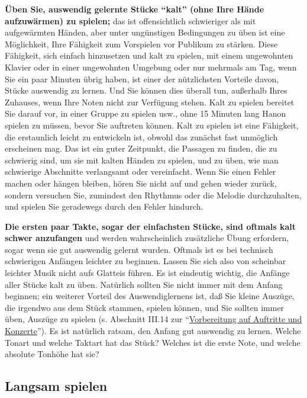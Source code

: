 \textbf{Üben Sie, auswendig gelernte Stücke \enquote{kalt} (ohne Ihre Hände aufzuwärmen) zu spielen;} das ist offensichtlich schwieriger als mit aufgewärmten Händen, aber unter ungünstigen Bedingungen zu üben ist eine Möglichkeit, Ihre Fähigkeit zum Vorspielen vor Publikum zu stärken.
Diese Fähigkeit, sich einfach hinzusetzen und kalt zu spielen, mit einem ungewohnten Klavier oder in einer ungewohnten Umgebung oder nur mehrmals am Tag, wenn Sie ein paar Minuten übrig haben, ist einer der nützlichsten Vorteile davon, Stücke auswendig zu lernen.
Und Sie können dies überall tun, außerhalb Ihres Zuhauses, wenn Ihre Noten nicht zur Verfügung stehen.
Kalt zu spielen bereitet Sie darauf vor, in einer Gruppe zu spielen usw., ohne 15 Minuten lang Hanon spielen zu müssen, bevor Sie auftreten können.
Kalt zu spielen ist eine Fähigkeit, die erstaunlich leicht zu entwickeln ist, obwohl das zunächst fast unmöglich erscheinen mag.
Das ist ein guter Zeitpunkt, die Passagen zu finden, die zu schwierig sind, um sie mit kalten Händen zu spielen, und zu üben, wie man schwierige Abschnitte verlangsamt oder vereinfacht.
Wenn Sie einen Fehler machen oder hängen bleiben, hören Sie nicht auf und gehen wieder zurück, sondern versuchen Sie, zumindest den Rhythmus oder die Melodie durchzuhalten, und spielen Sie geradewegs durch den Fehler hindurch.

\textbf{Die ersten paar Takte, sogar der einfachsten Stücke, sind oftmals kalt schwer anzufangen} und werden wahrscheinlich zusätzliche Übung erfordern, sogar wenn sie gut auswendig gelernt wurden.
Oftmals ist es bei technisch schwierigen Anfängen leichter zu beginnen.
Lassen Sie sich also von scheinbar leichter Musik nicht aufs Glatteis führen.
Es ist eindeutig wichtig, die Anfänge aller Stücke kalt zu üben.
Natürlich sollten Sie nicht immer mit dem Anfang beginnen; ein weiterer Vorteil des Auswendiglernens ist, daß Sie kleine Auszüge, die irgendwo aus dem Stück stammen, spielen können, und Sie sollten immer üben, Auszüge zu spielen (s. Abschnitt III.14 zur \enquote{\hyperlink{c1iii14}{Vorbereitung auf Auftritte und Konzerte}}).
Es ist natürlich ratsam, den Anfang gut auswendig zu lernen.
Welche Tonart und welche Taktart hat das Stück?
Welches ist die erste Note, und welche absolute Tonhöhe hat sie?
 

\subsection{Langsam spielen}\hypertarget{c1iii6h}{}

